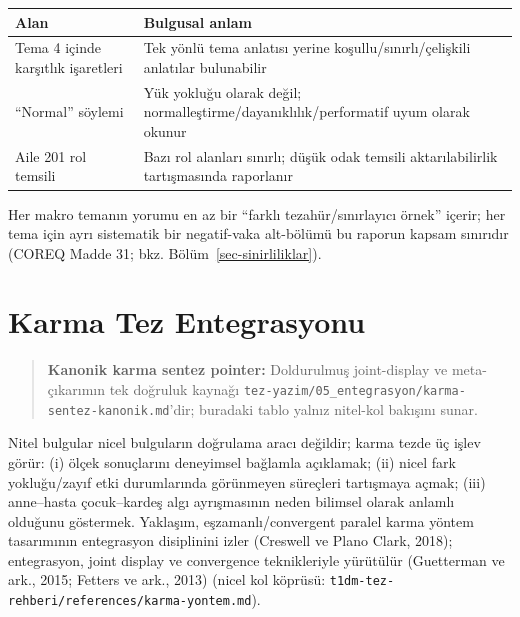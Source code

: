 \documentclass[
  turkish,
  a4paper,
  DIV=11,
  numbers=noendperiod]{scrreprt}
\newcounter{none} %
\begin{document}
{\def\LTcaptype{none} %
\begin{longtable}[]{@{}
  >{\raggedright\arraybackslash}p{}
  >{\raggedright\arraybackslash}p{}@{}}
\toprule\noalign{}
\begin{minipage}[b]{\linewidth}\raggedright
Alan
\end{minipage} & \begin{minipage}[b]{\linewidth}\raggedright
Bulgusal anlam
\end{minipage} \\
\midrule\noalign{}
\endhead
\bottomrule\noalign{}
\endlastfoot
Tema 4 içinde karşıtlık işaretleri & Tek yönlü tema anlatısı yerine
koşullu/sınırlı/çelişkili anlatılar bulunabilir \\
``Normal'' söylemi & Yük yokluğu olarak değil;
normalleştirme/dayanıklılık/performatif uyum olarak okunur \\
Aile 201 rol temsili & Bazı rol alanları sınırlı; düşük odak temsili
aktarılabilirlik tartışmasında raporlanır \\
\end{longtable}
}

Her makro temanın yorumu en az bir ``farklı tezahür/sınırlayıcı örnek''
içerir; her tema için ayrı sistematik bir negatif-vaka alt-bölümü bu
raporun kapsam sınırıdır (COREQ Madde 31; bkz.
Bölüm~\ref{sec-sinirliliklar}).

\chapter{Karma Tez Entegrasyonu}\label{sec-karma}

\begin{quote}
\textbf{Kanonik karma sentez pointer:} Doldurulmuş joint-display ve
meta-çıkarımın tek doğruluk kaynağı
\texttt{tez-yazim/05\_entegrasyon/karma-sentez-kanonik.md}'dir; buradaki
tablo yalnız nitel-kol bakışını sunar.
\end{quote}

Nitel bulgular nicel bulguların doğrulama aracı değildir; karma tezde üç
işlev görür: (i) ölçek sonuçlarını deneyimsel bağlamla açıklamak; (ii)
nicel fark yokluğu/zayıf etki durumlarında görünmeyen süreçleri
tartışmaya açmak; (iii) anne--hasta çocuk--kardeş algı ayrışmasının
neden bilimsel olarak anlamlı olduğunu göstermek. Yaklaşım,
eşzamanlı/convergent paralel karma yöntem tasarımının entegrasyon
disiplinini izler (Creswell ve Plano Clark, 2018); entegrasyon, joint
display ve convergence teknikleriyle yürütülür (Guetterman ve ark.,
2015; Fetters ve ark., 2013) (nicel kol köprüsü:
\texttt{t1dm-tez-rehberi/references/karma-yontem.md}).
\end{document}
